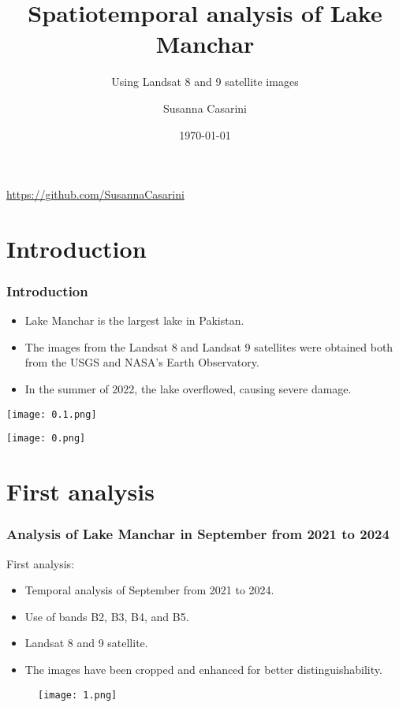 \documentclass{beamer}
\title{Spatiotemporal analysis of Lake Manchar}
\subtitle{Using Landsat 8 and 9 satellite images}
\author{Susanna Casarini}
\date{\today}
\begin{document}
\begin{frame}
  \titlepage
  \centering
  \usepackage{hyperref}
  \href{https://github.com/SusannaCasarini}{https://github.com/SusannaCasarini}  

\end{frame}

\section{Introduction}
\begin{frame}
  \frametitle{\small Introduction}
  
  \begin{itemize}
      \item \small Lake Manchar is the largest lake in Pakistan.
      \item \small The images from the Landsat 8 and Landsat 9 satellites were obtained both from the USGS and NASA's Earth Observatory.
      \item \small In the summer of 2022, the lake overflowed, causing severe damage.
  \end{itemize}
  
  \begin{minipage}{0.48\textwidth}
    \centering
    \texttt{[image: 0.1.png]}
    \caption{}
  \end{minipage}
  \hfill
  \begin{minipage}{0.48\textwidth}
    \centering
    \texttt{[image: 0.png]}
  \end{minipage}
 \end{frame}  

\section{First analysis}

\begin{frame}
  \frametitle{\small Analysis of Lake Manchar in September from 2021 to 2024} 
    \small First analysis:
    \begin{itemize}
        \item \small Temporal analysis of September from 2021 to 2024.
        \item \small Use of bands B2, B3, B4, and B5.
        \item \small Landsat 8 and 9 satellite.
        \item \small The images have been cropped and enhanced for better distinguishability.
    \end{itemize}

    \begin{figure}
        \centering
        \texttt{[image: 1.png]}
        \label{fig:enter-label}
    \end{figure}
  
\end{frame}
\end{document}
